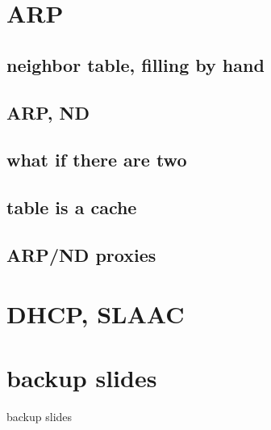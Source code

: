 \section{ARP}

\subsection{neighbor table, filling by hand}


\subsection{ARP, ND}

\subsection{what if there are two}

\subsection{table is a cache}

\subsection{ARP/ND proxies}


\section{DHCP, SLAAC}



\section{backup slides}
\begin{frame}{backup slides}
\end{frame}


